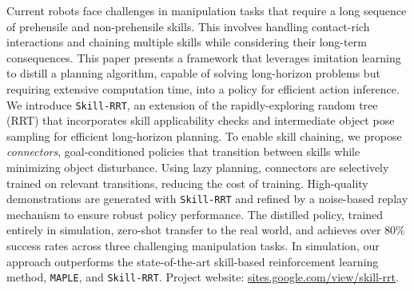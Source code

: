 Current robots face challenges in manipulation tasks that require a long sequence of prehensile and non-prehensile skills. This involves handling contact-rich interactions and chaining multiple skills while considering their long-term consequences. This paper presents a framework that leverages imitation learning to distill a planning algorithm, capable of solving long-horizon problems but requiring extensive computation time, into a policy for efficient action inference. We introduce \texttt{Skill-RRT}, an extension of the rapidly-exploring random tree (RRT) that incorporates skill applicability checks and intermediate object pose sampling for efficient long-horizon planning. To enable skill chaining, we propose \textit{connectors}, goal-conditioned policies that transition between skills while minimizing object disturbance. Using lazy planning, connectors are selectively trained on relevant transitions, reducing the cost of training. High-quality demonstrations are generated with \texttt{Skill-RRT} and refined by a noise-based replay mechanism to ensure robust policy performance. The distilled policy, trained entirely in simulation, zero-shot transfer to the real world, and achieves over 80\% success rates across three challenging manipulation tasks. In simulation, our approach outperforms the state-of-the-art skill-based reinforcement learning method, \texttt{MAPLE}, and \texttt{Skill-RRT}. Project website: \href{https://sites.google.com/view/skill-rrt}{sites.google.com/view/skill-rrt}. %




